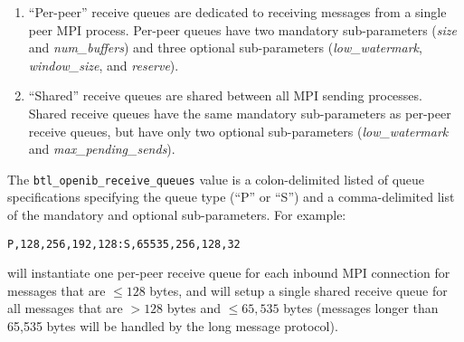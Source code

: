 \begin{enumerate}
\item ``Per-peer'' receive queues are dedicated to receiving messages
  from a single peer MPI process. Per-peer queues have two mandatory
  sub-parameters ({\em size} and {\em num\_\-buffers}) and three
  optional sub-parameters ({\em low\_\-watermark}, {\em
    window\_\-size}, and {\em reserve}).

\item ``Shared'' receive queues are shared between all MPI sending
  processes. Shared receive queues have the same mandatory
  sub-parameters as per-peer receive queues, but have only two
  optional sub-parameters ({\em low\_\-watermark} and {\em
    max\_\-pending\_\-sends}).
\end{enumerate}

The {\tt btl\_\-openib\_\-receive\_\-queues} value is a
colon-delimited listed of queue specifications specifying the queue
type (``P'' or ``S'') and a comma-delimited list of the mandatory and
optional sub-parameters.  For example:

\vspace{5pt}
\centerline{\tt P,128,256,192,128:S,65535,256,128,32}
\vspace{5pt}

will instantiate one per-peer receive queue for each inbound MPI
connection for messages that are $\le128$ bytes, and will setup a
single shared receive queue for all messages that are $>128$ bytes and
$\le65,535$ bytes (messages longer than 65,535 bytes will be handled
by the long message protocol).

